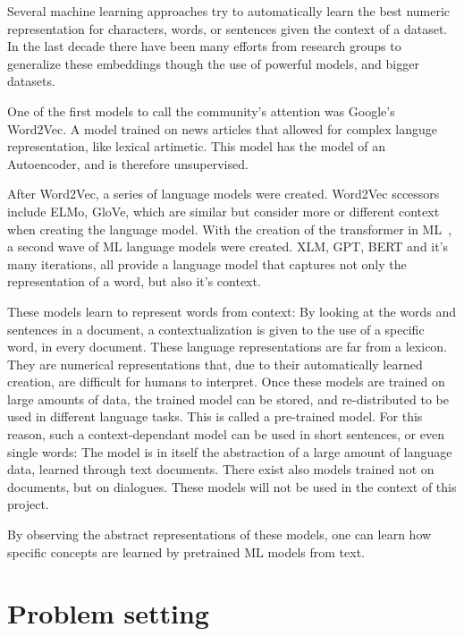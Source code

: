 Several machine learning approaches try to automatically learn the best numeric representation for characters, words, or sentences given the context of a dataset. In the last decade there have been many efforts from research groups to generalize these embeddings though the use of powerful models, and bigger datasets.

One of the first models to call the community's attention was Google's Word2Vec\cite{mikolov2013word2vec}. A model trained on news articles that allowed for complex languge representation, like lexical artimetic. This model has the model of an Autoencoder, and is therefore unsupervised.

After Word2Vec, a series of language models were created. Word2Vec sccessors include ELMo, GloVe, which are similar but consider more or different context when creating the language model. With the creation of the transformer in ML~\cite{vaswani2017transformer}, a second wave of ML language models were created. XLM, GPT, BERT and it's many iterations, all provide a language model that captures not only the representation of a word, but also it's context.

These models learn to represent words from context: By looking at the words and sentences in a document, a contextualization is given to the use of a specific word, in every document. These language representations are far from a lexicon. They are numerical representations that, due to their automatically learned creation, are difficult for humans to interpret. Once these models are trained on large amounts of data, the trained model can be stored, and re-distributed to be used in different language tasks. This is called a pre-trained model. For this reason, such a context-dependant model can be used in short sentences, or even single words: The model is in itself the abstraction of a large amount of language data, learned through text documents.
There exist also models trained not on documents, but on dialogues. These models will not be used in the context of this project.

By observing the abstract representations of these models, one can learn how specific concepts are learned by pretrained ML models from text.

\section{Problem setting}\label{sec:Problem setting}


